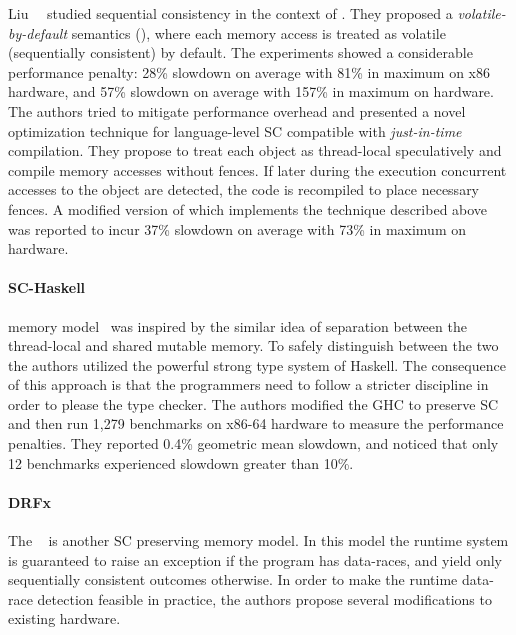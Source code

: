 Liu~\etal~\cite{Liu-al:OOPSLA17, Liu-al:PLDI19} studied 
sequential consistency in the context of \Java.  
They proposed a \emph{volatile-by-default} semantics (\VbD),
where each memory access is treated as volatile 
(\ie sequentially consistent) by default. 
The experiments showed a considerable performance penalty:
28\% slowdown on average with 81\% in maximum on x86 hardware,
and 57\% slowdown on average with 157\% in maximum on  hardware.
The authors tried to mitigate performance overhead and presented  
a novel optimization technique for language-level SC
compatible with \emph{just-in-time} compilation. 
They propose to treat each object as thread-local speculatively 
and compile memory accesses without fences. 
If later during the execution concurrent accesses to the object  
are detected, the code is recompiled to place necessary fences.
A modified version of \JVM which implements the technique
described above was reported to incur 37\% slowdown on average 
with 73\% in maximum on  hardware.

\paragraph{SC-Haskell}

\SCHs memory model~\cite{Vollmer-al:PPoPP17}
was inspired by the similar idea of separation
between the thread-local and shared mutable memory. 
To safely distinguish between the two 
the authors utilized the powerful strong type system of Haskell. 
The consequence of this approach is that the 
programmers need to follow a stricter discipline 
in order to please the type checker. 
The authors modified the GHC to preserve SC 
and then run 1,279 benchmarks on x86-64 hardware
to measure the performance penalties.
They reported 0.4\% geometric mean slowdown,
and noticed that only 12 benchmarks experienced 
slowdown greater than 10\%.

\paragraph{DRFx}

The \DRFx~\cite{Marino-al:PLDI10} is another 
SC preserving memory model. In this model
the runtime system is guaranteed to raise 
an exception if the program has data-races, 
and yield only sequentially consistent outcomes otherwise.
In order to make the runtime data-race detection feasible 
in practice, the authors propose several modifications 
to existing hardware.

